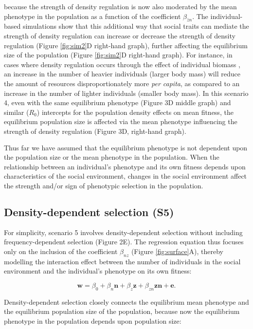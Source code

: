 \documentclass{article}
\begin{document}
\noindent because the strength of density regulation is now also moderated by the mean phenotype in the population as a function of the coefficient  $\beta_{\bar{z}n}$. The individual-based simulations show that this additional way that social traits can mediate the strength of density regulation can increase or decrease the strength of density regulation (Figure \ref{fig:sim2}D right-hand graph), further affecting the equilibrium size of the population (Figure \ref{fig:sim2}D right-hand graph). For instance, in cases where density regulation occurs through the effect of individual biomass \citep{Owen-Smith2002}, an increase in the number of heavier individuals (larger body mass) will reduce the amount of resources disproportionately more \textit{per capita}, as compared to an increase in the number of lighter individuals (smaller body mass). In this scenario 4, even with the same equilibrium phenotype (Figure 3D middle graph) and similar ($R_0$) intercepts for the population density effects on mean fitness, the equilibrium population size is affected via the mean phenotype influencing the strength of density regulation (Figure 3D, right-hand graph). 

Thus far we have assumed that the equilibrium phenotype is not dependent upon the population size or the mean phenotype in the population. When the relationship between an individual's phenotype and its own fitness depends upon characteristics of the social environment, changes in the social environment affect the strength and/or sign of phenotypic selection in the population. 
 
 \subsection{Density-dependent selection (S5)}
 For simplicity, scenario 5 involves density-dependent selection without including frequency-dependent selection (Figure 2E). The regression equation thus focuses only on the inclusion of the coefficient $\beta_{nz}$ (Figure \ref{fig:surface}A), thereby modelling the interaction effect between the number of individuals in the social environment and the individual's phenotype on its own fitness:

\begin{equation} \label{eq: DDRS}
\mathbf{w}=\beta_{0} +\beta_{n} \mathbf{n} + \beta_{z} \mathbf{z}+  \beta_{zn} \mathbf{zn}  +  \mathbf{e}.
\end{equation}

\noindent Density-dependent selection closely connects the equilibrium mean phenotype and the equilibrium population size of the population, because now the equilibrium phenotype in the population depends upon population size:
\end{document}
